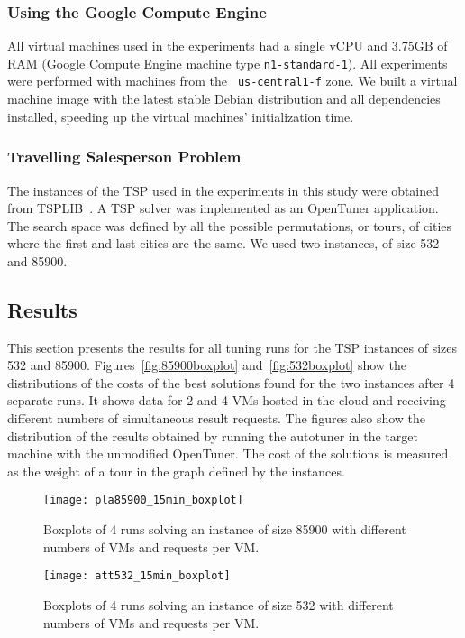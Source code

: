 \subsubsection{Using the Google Compute Engine}

All virtual machines used in the experiments had a single vCPU and 3.75GB of
RAM (Google Compute Engine machine type \texttt{\footnotesize n1-standard-1}).
All experiments were performed with machines from the \texttt{\footnotesize
us-central1-f} zone. We built a virtual machine image with the latest stable
Debian distribution and all dependencies installed, speeding up the virtual
machines' initialization time.

\subsubsection{Travelling Salesperson Problem}

The instances of the TSP used in the experiments in this study were obtained
from TSPLIB~\cite{reinelt1991tsplib}.  A TSP solver was implemented as an
OpenTuner application. The search space was defined by all the possible
permutations, or tours, of cities where the first and last cities are the same.
We used two instances, of size 532 and 85900.

\subsection{Results}
\label{sec:results}

This section presents the results for all tuning runs for the TSP instances of
sizes 532 and 85900.  Figures~\ref{fig:85900boxplot} and~\ref{fig:532boxplot}
show the distributions of the costs of the best solutions found for the two
instances after 4 separate runs. It shows data for 2 and 4 VMs hosted in the
cloud and receiving different numbers of simultaneous result requests.  The
figures also show the distribution of the results obtained by running the
autotuner in the target machine with the unmodified OpenTuner.  The cost of the
solutions is measured as the weight of a tour in the graph defined by the
instances.

\begin{figure}[htpb]
    \centering
    \begin{minipage}{.48\textwidth}
        \centering
        \texttt{[image: pla85900\_15min\_boxplot]}
        \caption{Boxplots of 4 runs solving an instance of size 85900 with
                 different numbers of VMs and requests per VM.}
        \label{fig:85900boxplot}
    \end{minipage}%
    \hfill
    \begin{minipage}{.48\textwidth}
        \centering
        \texttt{[image: att532\_15min\_boxplot]}
        \caption{Boxplots of 4 runs solving an instance of size 532 with
                 different numbers of VMs and requests per VM.}
        \label{fig:532boxplot}
    \end{minipage}%
    \label{fig:boxplots}
\end{figure}

